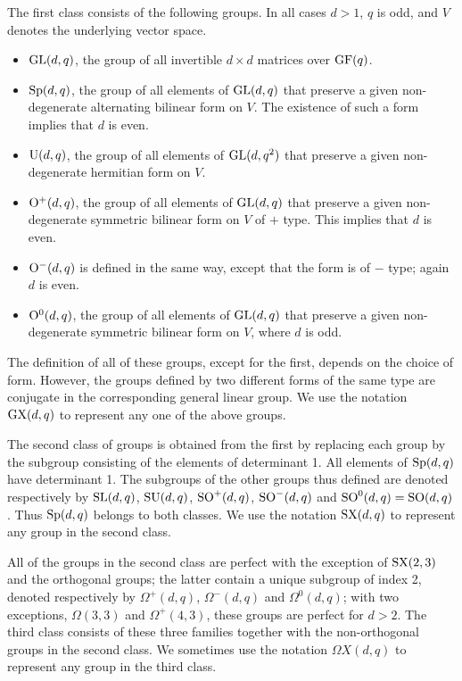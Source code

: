 \documentclass[12pt]{article}
\def\O{{\rm O}}  %
\def\SL{{\rm SL}}
\def\SO{{\rm SO}}
\def\SP{{\rm Sp}}
\def\GL{{\rm GL}}
\def\U{{\rm U}}
\def\GF{{\rm GF}}
\def\Sp{{\rm Sp}}
\def\SU{{\rm SU}}
\def\SX{{\rm SX}}
\def\GX{{\rm GX}}
\begin{document}
The first class consists of the following groups.
In all cases $d > 1$, $q$ is odd, and $V$ denotes the underlying vector space.

\begin{itemize}
\item $\GL(d,q)$, the group of all invertible $d\times d$ matrices 
over $\GF(q)$.

\item $\Sp(d,q)$, the group of all elements of $\GL(d,q)$ that preserve 
a given non-degenerate
alternating bilinear form on $V$.  The existence of such a form 
implies that $d$ is even.

\item $\U(d,q)$, the group of all elements of $\GL(d,q^2)$ that 
preserve a given non-degenerate
hermitian form on $V$.

\item $\O^+(d,q)$, the group of all elements of $\GL(d,q)$ that 
preserve a given 
non-degenerate symmetric bilinear form 
on $V$ of $+$ type.  This implies that $d$ is even.

\item $\O^-(d,q)$ is defined  in the same way, except that the 
form is of $-$ type; again $d$ is even.

\item $\O^0(d,q)$, the group of all elements of $\GL(d,q)$ that preserve 
a given non-degenerate symmetric bilinear form on $V$, where $d$ is odd.
\end{itemize}

The definition of all of these groups, except for the first, 
depends on the choice of form.  However, the groups defined by 
two different forms of the same type 
are conjugate in the corresponding general linear group. 
We use the notation $\GX(d,q)$ to represent any one of the above groups.

The second class of groups is obtained from the first by replacing
each group by the subgroup consisting of the elements of determinant 1.
All elements of $\SP(d,q)$ have determinant 1.  The subgroups of the other
groups thus defined are denoted respectively by
$\SL(d,q)$, $\SU(d,q)$, $\SO^+(d,q)$, $\SO^-(d,q)$ 
and $\SO^0(d,q) = \SO(d, q)$.
Thus $\SP(d,q)$ belongs to both classes.
We use the notation $\SX(d,q)$ to represent any group in the second class.

All of the groups in the second class are perfect with the exception 
of $\SX(2, 3)$ and the orthogonal
groups; the latter contain a unique subgroup of index 2, denoted respectively 
by $\Omega^+(d,q)$, $\Omega^-(d,q)$ and $\Omega^0(d,q)$; with two 
exceptions, $\Omega(3, 3)$ and $\Omega^+(4, 3)$, these groups are 
perfect for $d>2$. 
The third class consists of these three families
together with the non-orthogonal groups in the second class.
We sometimes use the notation $\Omega X(d,q)$ to represent any 
group in the third class.
\end{document}

